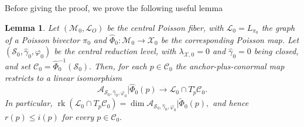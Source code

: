 \documentclass[reqno]{amsart}
\theoremstyle{plain}
\newtheorem{Lem}[Thm]{Lemma}
\theoremstyle{definition}
\newcommand{\too}{\longrightarrow}
\newcommand{\rk}{\operatorname{rk}}
\newcommand{\C}{\mathcal{C}}
\renewcommand{\S}{\mathcal{S}}
\newcommand{\M}{\mathcal{M}}
\renewcommand{\L}{\mathcal{L}}
\newcommand{\X}{\mathcal{X}}
\newcommand{\A}{\mathcal{A}}
\begin{document}
Before giving the proof, we prove the following useful lemma 

\begin{Lem} \label{lem:central}
    Let $(\M_0,\L_O)$ be the central Poisson fiber, with $\L_{0} = L_{\pi_0}$ the graph of a Poisson bivector $\pi_0$ and $\widehat{\Phi}_0: \M_0 \too \X_0$ be the corresponding Poisson map. Let $(\S_0,\hat{\gamma}_0,\varphi_0)$ be the central reduction level, with $\lambda_{\X,0} = 0$ and $\hat{\gamma}_0 = 0$ being closed, and set $\C_0 = \widehat{\Phi}^{-1}_{0}(\S_0).$ Then, for each $p\in \C_0$ the anchor-plus-conormal map restricts to a linear isomorphism \[
    \A_{\S_0,\hat{\gamma}_{0},\varphi_0}|\widehat{\Phi}_{0}(p) \too \L_0 \cap T_{p}^{\circ }\C_0.
    \]
    In particular, $\rk(\L_0 \cap T_{p}\C_0) = \dim \A_{\S_0,\hat{\gamma}_0,\varphi_0}|\widetilde{\Phi}_{0}(p),$ and hence $r(p) \leq i(p)$ for every $p \in \C_0.$
\end{Lem}
\end{document}
